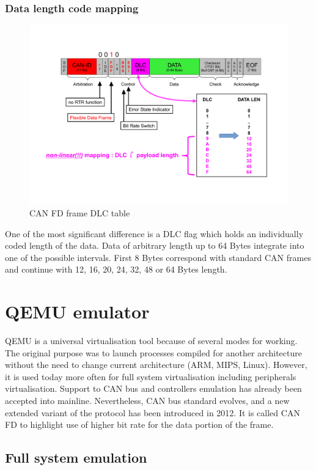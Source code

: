 \documentclass{ctuthesis}
\begin{document}
  \subsection{Data length code mapping}
   \begin{figure}[H]
   \includegraphics[width=1\textwidth]{agl2017-socketcan-can_fd_dlc}
   \caption{CAN FD frame DLC table \cite{canfd_dlc}}
   \end{figure}
   One of the most significant difference is a DLC flag which holds an individually coded length of the data. Data of arbitrary length up to 64 Bytes integrate into one of the possible intervals. First 8 Bytes correspond with standard CAN frames and continue with 12, 16, 20, 24, 32, 48 or 64 Bytes length.
 
\chapter{QEMU emulator}
 QEMU is a universal virtualisation tool because of several modes for working. The original purpose was to launch processes compiled for another architecture without the need to change current architecture (ARM, MIPS, Linux). However, it is used today more often for full system virtualisation including peripherals virtualisation. Support to CAN bus and controllers emulation has already been accepted into mainline. Nevertheless, CAN bus standard evolves, and a new extended variant of the protocol has been introduced in 2012. It is called CAN FD to highlight use of higher bit rate for the data portion of the frame.

 \section{Full system emulation}
\end{document}
